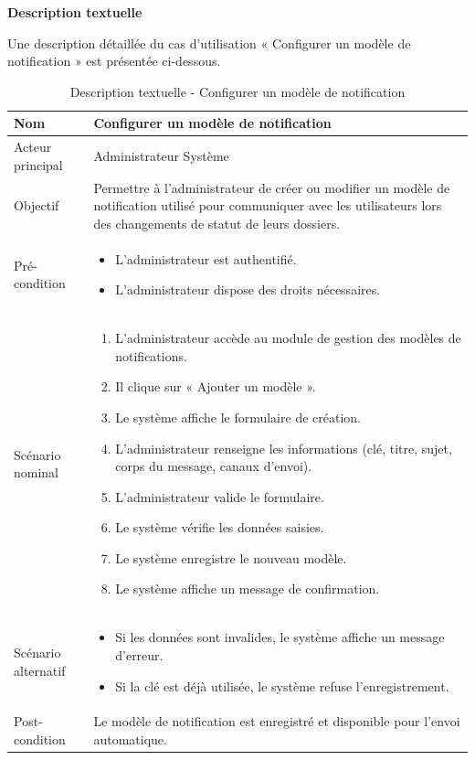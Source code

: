 \textbf{Description textuelle}

Une description détaillée du cas d'utilisation « Configurer un modèle de notification » est présentée ci-dessous.

\begin{table}[H]
\centering
\begin{tabular}{ |p{4cm}|p{12cm}|} \hline

Nom & Configurer un modèle de notification \\ \hline

Acteur principal & Administrateur Système \\ \hline

Objectif & Permettre à l'administrateur de créer ou modifier un modèle de notification utilisé pour communiquer avec les utilisateurs lors des changements de statut de leurs dossiers. \\ \hline

Pré-condition &
\begin{itemize}
    \item L'administrateur est authentifié.
    \item L'administrateur dispose des droits nécessaires.
\end{itemize}
\\ \hline

Scénario nominal &
\begin{enumerate}
    \item L'administrateur accède au module de gestion des modèles de notifications.
    \item Il clique sur « Ajouter un modèle ».
    \item Le système affiche le formulaire de création.
    \item L'administrateur renseigne les informations (clé, titre, sujet, corps du message, canaux d'envoi).
    \item L'administrateur valide le formulaire.
    \item Le système vérifie les données saisies.
    \item Le système enregistre le nouveau modèle.
    \item Le système affiche un message de confirmation.
\end{enumerate}
\\ \hline

Scénario alternatif &
\begin{itemize}
    \item Si les données sont invalides, le système affiche un message d'erreur.
    \item Si la clé est déjà utilisée, le système refuse l'enregistrement.
\end{itemize}
\\ \hline

Post-condition &
Le modèle de notification est enregistré et disponible pour l'envoi automatique. \\ \hline

\end{tabular}
\caption{Description textuelle - Configurer un modèle de notification}
\label{tab:configurer-modele-notif}
\end{table}


